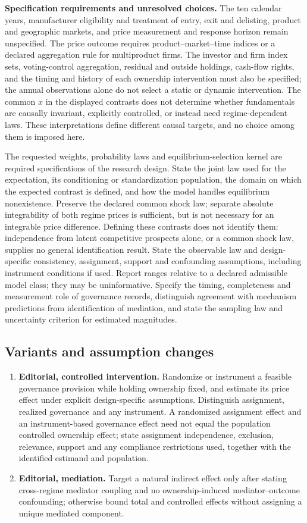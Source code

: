 \documentclass[11pt,a4paper]{article}
\begin{document}
\textbf{Specification requirements and unresolved choices.} The ten calendar years, manufacturer eligibility and treatment of entry, exit and delisting, product and geographic markets, and price measurement and response horizon remain unspecified. The price outcome requires product--market--time indices or a declared aggregation rule for multiproduct firms. The investor and firm index sets, voting-control aggregation, residual and outside holdings, cash-flow rights, and the timing and history of each ownership intervention must also be specified; the annual observations alone do not select a static or dynamic intervention. The common \(x\) in the displayed contrasts does not determine whether fundamentals are causally invariant, explicitly controlled, or instead need regime-dependent laws. These interpretations define different causal targets, and no choice among them is imposed here.

The requested weights, probability laws and equilibrium-selection kernel are required specifications of the research design. State the joint law used for the expectation, its conditioning or standardization population, the domain on which the expected contrast is defined, and how the model handles equilibrium nonexistence. Preserve the declared common shock law; separate absolute integrability of both regime prices is sufficient, but is not necessary for an integrable price difference. Defining these contrasts does not identify them: independence from latent competitive prospects alone, or a common shock law, supplies no general identification result. State the observable law and design-specific consistency, assignment, support and confounding assumptions, including instrument conditions if used. Report ranges relative to a declared admissible model class; they may be uninformative. Specify the timing, completeness and measurement role of governance records, distinguish agreement with mechanism predictions from identification of mediation, and state the sampling law and uncertainty criterion for estimated magnitudes.
\subsection*{Variants and assumption changes}
\begin{enumerate}
\item \textbf{Editorial, controlled intervention.} Randomize or instrument a feasible governance provision while holding ownership fixed, and estimate its price effect under explicit design-specific assumptions. Distinguish assignment, realized governance and any instrument. A randomized assignment effect and an instrument-based governance effect need not equal the population controlled ownership effect; state assignment independence, exclusion, relevance, support and any compliance restrictions used, together with the identified estimand and population.
\item \textbf{Editorial, mediation.} Target a natural indirect effect only after stating cross-regime mediator coupling and no ownership-induced mediator--outcome confounding; otherwise bound total and controlled effects without assigning a unique mediated component.
\end{enumerate}
\end{document}
